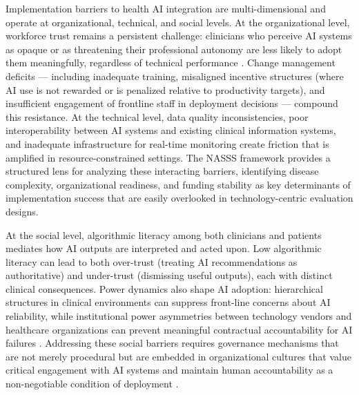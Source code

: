Implementation barriers to health AI integration are multi-dimensional and
operate at organizational, technical, and social levels. At the organizational
level, workforce trust remains a persistent challenge: clinicians who
perceive AI systems as opaque or as threatening their professional autonomy
are less likely to adopt them meaningfully, regardless of technical
performance \citep{keri2026simulated}. Change management deficits — including
inadequate training, misaligned incentive structures (where AI use is not
rewarded or is penalized relative to productivity targets), and insufficient
engagement of frontline staff in deployment decisions — compound this resistance.
At the technical level, data quality inconsistencies, poor interoperability
between AI systems and existing clinical information systems, and inadequate
infrastructure for real-time monitoring create friction that is amplified in
resource-constrained settings. The NASSS framework \citep[Non-Adoption,
Abandonment, Scale-up, Spread, Sustainability]{greenhalgh2017nasps} provides
a structured lens for analyzing these interacting barriers, identifying
disease complexity, organizational readiness, and funding stability as key
determinants of implementation success that are easily overlooked in
technology-centric evaluation designs.

At the social level, algorithmic literacy among both clinicians and patients
mediates how AI outputs are interpreted and acted upon. Low algorithmic
literacy can lead to both over-trust (treating AI recommendations as
authoritative) and under-trust (dismissing useful outputs), each with
distinct clinical consequences. Power dynamics also shape AI adoption:
hierarchical structures in clinical environments can suppress front-line
concerns about AI reliability, while institutional power asymmetries between
technology vendors and healthcare organizations can prevent meaningful
contractual accountability for AI failures \citep{abulibdeh2025illusion}.
Addressing these social barriers requires governance mechanisms that are
not merely procedural but are embedded in organizational cultures that
value critical engagement with AI systems and maintain human accountability
as a non-negotiable condition of deployment \citep{bouderhem2025shaping,
abdul2025ai, hussein2026governance}.